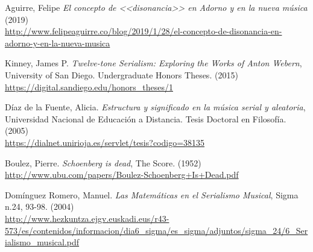 \renewcommand\refname{Referencias}
	\begin{thebibliography}{00}
			
			

			{ Aguirre, Felipe} 
			\textit{El concepto de <<disonancia>> en Adorno y en la nueva música }
			(2019)
			\\\url{http://www.felipeaguirre.co/blog/2019/1/28/el-concepto-de-disonancia-en-adorno-y-en-la-nueva-musica}
			
			{ Kinney, James P.} 
			\textit{Twelve-tone Serialism: Exploring the Works of Anton Webern},
			University of San Diego.
			Undergraduate Honors Theses.
			(2015)
			\\\url{https://digital.sandiego.edu/honors_theses/1}
			
			{ D\'iaz de la Fuente, Alicia.} 
			\textit{Estructura y significado en la m\'usica serial y aleatoria},
			Universidad Nacional de Educaci\'on a Distancia.
			Tesis Doctoral en Filosof\'ia.
			(2005)
			\\\url{https://dialnet.unirioja.es/servlet/tesis?codigo=38135}		
			
			
			
			{ Boulez, Pierre.}
			\textit{Schoenberg is dead},
			The Score.
			(1952)
			\\\url{http://www.ubu.com/papers/Boulez-Schoenberg+Is+Dead.pdf}
			
			{ Dom\'inguez Romero, Manuel.} 
			\textit{Las Matem\'aticas en el Serialismo Musical},
			Sigma n.24, 93-98.
			(2004)
			\\\url{http://www.hezkuntza.ejgv.euskadi.eus/r43-573/es/contenidos/informacion/dia6_sigma/es_sigma/adjuntos/sigma_24/6_Serialismo_musical.pdf}


\end{thebibliography}
